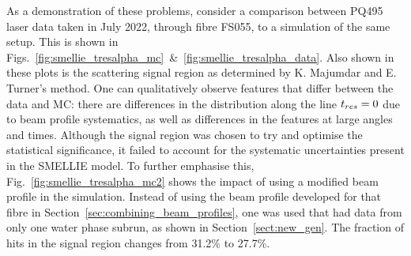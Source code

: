 As a demonstration of these problems, consider a comparison between PQ495 laser data taken in July 2022, through fibre FS055, to a simulation of the same setup. This is shown in Figs.~\ref{fig:smellie_tresalpha_mc}~\&~\ref{fig:smellie_tresalpha_data}. Also shown in these plots is the scattering signal region as determined by K. Majumdar and E. Turner's method. One can qualitatively observe features that differ between the data and MC: there are differences in the distribution along the line $t_{res}{} = 0$ due to beam profile systematics, as well as differences in the features at large angles and times. Although the signal region was chosen to try and optimise the statistical significance, it failed to account for the systematic uncertainties present in the SMELLIE model. To further emphasise this, Fig.~\ref{fig:smellie_tresalpha_mc2} shows the impact of using a modified beam profile in the simulation. Instead of using the beam profile developed for that fibre in Section~\ref{sec:combining_beam_profiles}, one was used that had data from only one water phase subrun, as shown in Section~\ref{sect:new_gen}. The fraction of hits in the signal region changes from 31.2\% to 27.7\%.

